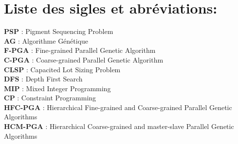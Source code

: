 \documentclass[12pt,a4paper]{article}
\begin{document}
	\newpage
	\tableofcontents
	
	\newpage
	
	\listoffigures
	
	\newpage
	
	\listoftables
	
	\newpage
	
	\listofalgorithms
	
	\newpage
	\section*{Liste des sigles et abréviations:}
	
	\vspace{1cm}
	
	\textbf{PSP} : Pigment Sequencing Problem \\
	\hspace*{.5cm} \textbf{AG} : Algorithme Génétique \\
	\hspace*{.5cm} \textbf{F-PGA} : Fine-grained Parallel Genetic Algorithm \\
	\hspace*{.5cm} \textbf{C-PGA} : Coarse-grained Parallel Genetic Algorithm \\
	\hspace*{.5cm} \textbf{CLSP} : Capacited Lot Sizing Problem \\
	\hspace*{.5cm} \textbf{DFS} : Depth First Search\\
	\hspace*{.5cm} \textbf{MIP} : Mixed Integer Programming \\
	\hspace*{.5cm} \textbf{CP} : Constraint Programming \\
	\hspace*{.5cm} \textbf{HFC-PGA} : Hierarchical Fine-grained and Coarse-grained Parallel Genetic Algorithms \\
\hspace*{.5cm} \textbf{HCM-PGA} : Hierarchical Coarse-grained and master-slave Parallel Genetic Algorithms \\
	
	
	\newpage %
	
\end{document}
